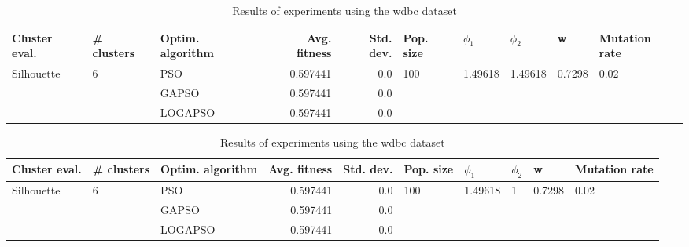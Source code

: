 \documentclass{article}
\begin{document}
\begin{table}
\centering
\caption{Results of experiments using the wdbc dataset}
\begin{tabular}{lllrrlllll}
\toprule
              Cluster eval. &        \# clusters & Optim. algorithm &  Avg. fitness &  Std. dev. &            Pop. size &               $\phi_{1}$ &               $\phi_{2}$ &                       w &         Mutation rate \\
\midrule
\multirow{3}{*}{Silhouette} & \multirow{3}{*}{6} &              PSO &      0.597441 &        0.0 & \multirow{3}{*}{100} & \multirow{3}{*}{1.49618} & \multirow{3}{*}{1.49618} & \multirow{3}{*}{0.7298} & \multirow{3}{*}{0.02} \\
                            &                    &            GAPSO &      0.597441 &        0.0 &                      &                          &                          &                         &                       \\
                            &                    &          LOGAPSO &      0.597441 &        0.0 &                      &                          &                          &                         &                       \\
\bottomrule
\end{tabular}
\end{table}
\begin{table}
\centering
\caption{Results of experiments using the wdbc dataset}
\begin{tabular}{lllrrlllll}
\toprule
              Cluster eval. &        \# clusters & Optim. algorithm &  Avg. fitness &  Std. dev. &            Pop. size &               $\phi_{1}$ &         $\phi_{2}$ &                       w &         Mutation rate \\
\midrule
\multirow{3}{*}{Silhouette} & \multirow{3}{*}{6} &              PSO &      0.597441 &        0.0 & \multirow{3}{*}{100} & \multirow{3}{*}{1.49618} & \multirow{3}{*}{1} & \multirow{3}{*}{0.7298} & \multirow{3}{*}{0.02} \\
                            &                    &            GAPSO &      0.597441 &        0.0 &                      &                          &                    &                         &                       \\
                            &                    &          LOGAPSO &      0.597441 &        0.0 &                      &                          &                    &                         &                       \\
\bottomrule
\end{tabular}
\end{table}
\end{document}

